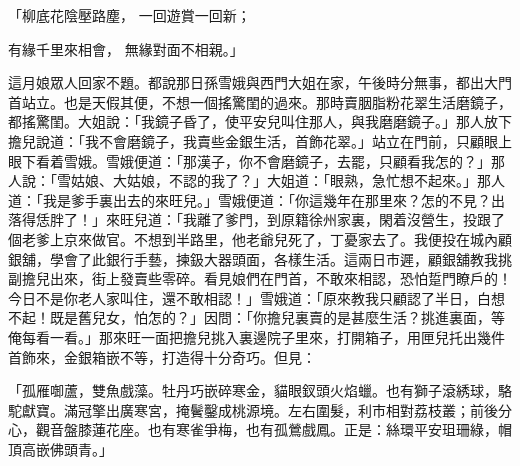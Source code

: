 \begin{showcontents}{}
「柳底花陰壓路塵，  一回遊賞一回新；

有緣千里來相會，  無緣對面不相親。」

這月娘眾人回家不題。都說那日孫雪娥與西門大姐在家，午後時分無事，都出大門首站立。也是天假其便，不想一個搖驚閨的過來。那時賣胭脂粉花翠生活磨鏡子，都搖驚閨。大姐說：「我鏡子昏了，使平安兒叫住那人，與我磨磨鏡子。」那人放下擔兒說道：「我不會磨鏡子，我賣些金銀生活，首飾花翠。」站立在門前，只顧眼上眼下看着雪娥。雪娥便道：「那漢子，你不會磨鏡子，去罷，只顧看我怎的？」那人說：「雪姑娘、大姑娘，不認的我了？」大姐道：「眼熟，急忙想不起來。」那人道：「我是爹手裏出去的來旺兒。」雪娥便道：「你這幾年在那里來？怎的不見？出落得恁胖了！」來旺兒道：「我離了爹門，到原籍徐州家裏，閑着沒營生，投跟了個老爹上京來做官。不想到半路里，他老爺兒死了，丁憂家去了。我便投在城內顧銀舖，學會了此銀行手藝，揀鈒大器頭面，各樣生活。這兩日市遲，顧銀舖教我挑副擔兒出來，街上發賣些零碎。看見娘們在門首，不敢來相認，恐怕踅門瞭戶的！今日不是你老人家叫住，還不敢相認！」雪娥道：「原來教我只顧認了半日，白想不起！既是舊兒女，怕怎的？」因問：「你擔兒裏賣的是甚麼生活？挑進裏面，等俺每看一看。」那來旺一面把擔兒挑入裏邊院子里來，打開箱子，用匣兒托出幾件首飾來，金銀箱嵌不等，打造得十分奇巧。但見：

「孤雁啣蘆，雙魚戲藻。牡丹巧嵌碎寒金，貓眼釵頭火焰蠟。也有獅子滾綉球，駱駝獻寶。滿冠擎出廣寒宮，掩鬢鑿成桃源境。左右圍髮，利市相對荔枝叢；前後分心，觀音盤膝蓮花座。也有寒雀爭梅，也有孤鶯戲鳳。正是：絲環平安珇珊綠，帽頂高嵌佛頭青。」


\end{showcontents}

